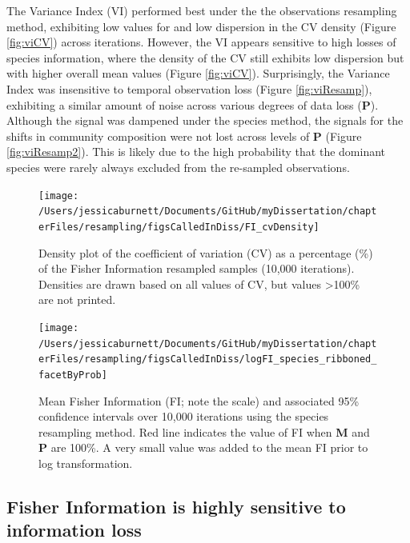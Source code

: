 \documentclass[12pt,twoside,openany]{reedthesis}
\begin{document}
The Variance Index (VI) performed best under the the observations resampling method, exhibiting low values for and low dispersion in the CV density (Figure \ref{fig:viCV}) across iterations. However, the VI appears sensitive to high losses of species information, where the density of the CV still exhibits low dispersion but with higher overall mean values (Figure \ref{fig:viCV}). Surprisingly, the Variance Index was insensitive to temporal observation loss (Figure \ref{fig:viResamp}), exhibiting a similar amount of noise across various degrees of data loss (\(\textbf{P}\)). Although the signal was dampened under the species method, the signals for the shifts in community composition were not lost across levels of \(\textbf{P}\) (Figure \ref{fig:viResamp2}). This is likely due to the high probability that the dominant species were rarely always excluded from the re-sampled observations.

\begin{figure}
\texttt{[image: /Users/jessicaburnett/Documents/GitHub/myDissertation/chapterFiles/resampling/figsCalledInDiss/FI\_cvDensity]} \caption{Density plot of the coefficient of variation (CV) as a percentage (\%) of the Fisher Information resampled samples (10,000 iterations). Densities are drawn based on all values of CV, but values \textgreater100\% are not printed.}\label{fig:fiCV}
\end{figure}

\begin{figure}
\texttt{[image: /Users/jessicaburnett/Documents/GitHub/myDissertation/chapterFiles/resampling/figsCalledInDiss/logFI\_species\_ribboned\_facetByProb]} \caption{Mean Fisher Information (FI; note the scale) and associated 95\% confidence intervals over 10,000 iterations using the species resampling method. Red line indicates the value of FI when \textbf{M} and \textbf{P} are 100\%. A very small value was added to the mean FI prior to log transformation.}\label{fig:fiResamp}
\end{figure}
\hypertarget{fisher-information-is-highly-sensitive-to-information-loss}{%
\subsection{Fisher Information is highly sensitive to information loss}\label{fisher-information-is-highly-sensitive-to-information-loss}}
\end{document}
